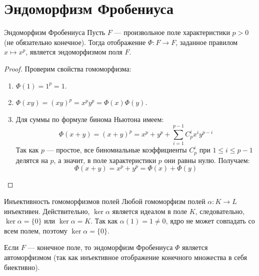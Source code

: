 
\section{Эндоморфизм Фробениуса}

\begin{Proposition}{Эндоморфизм Фробениуса}{}
	Пусть $F$ --- произвольное поле характеристики $p > 0$ (не обязательно конечное). Тогда отображение $\Phi: F \to F$, заданное правилом $x \mapsto x^p$, является эндоморфизмом поля $F$.
\end{Proposition}

\begin{proof}
	Проверим свойства гомоморфизма:
	\begin{enumerate}
		\item $\Phi(1) = 1^p = 1$.
		\item $\Phi(xy) = (xy)^p = x^p y^p = \Phi(x)\Phi(y)$.
		\item Для суммы по формуле бинома Ньютона имеем:
		\[ \Phi(x+y) = (x+y)^p = x^p + y^p + \sum_{i=1}^{p-1} C_p^i x^i y^{p-i} \]
		Так как $p$ --- простое, все биномиальные коэффициенты $C_p^i$ при $1 \le i \le p-1$ делятся на $p$, а значит, в поле характеристики $p$ они равны нулю. Получаем:
		\[ \Phi(x+y) = x^p + y^p = \Phi(x) + \Phi(y) \]
	\end{enumerate}
\end{proof}

\begin{Remark}{Инъективность гомоморфизмов полей}{}
	Любой гомоморфизм полей $\alpha: K \to L$ инъективен. Действительно, $\ker \alpha$ является идеалом в поле $K$, следовательно, $\ker \alpha = \{0\}$ или $\ker \alpha = K$. Так как $\alpha(1) = 1 \neq 0$, ядро не может совпадать со всем полем, поэтому $\ker \alpha = \{0\}$.
\end{Remark}

\begin{Corollary}{}{}
	Если $F$ --- конечное поле, то эндоморфизм Фробениуса $\Phi$ является автоморфизмом (так как инъективное отображение конечного множества в себя биективно).
\end{Corollary}
